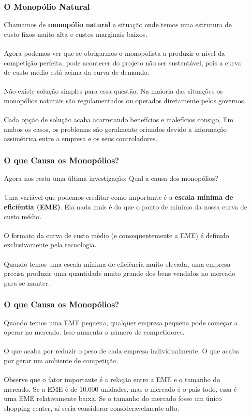 \documentclass{beamer}[10]
\begin{document}
\begin{frame}
	\frametitle{O Monopólio Natural}

	Chamamos de \textbf{monopólio natural} a situação onde temos uma estrutura de custo fixos muito alta e custos marginais baixos.
	\\~\\
	Agora podemos ver que se obrigarmos o monopolista a produzir o nível da competição perfeita, pode acontecer do projeto não ser sustentável, pois a curva de custo médio está acima da curva de demanda.
	\\~\\
	Não existe solução simples para essa questão. Na maioria das situações os monopólios naturais são regulamentados ou operados diretamente pelos governos.
	\\~\\
	Cada opção de solução acaba acarretando benefícios e malefícios consigo. Em ambos os casos, os problemas são geralmente oriundos devido a informação assimétrica entre a empresa e os seus controladores.
\end{frame}


\begin{frame}
	\frametitle{O que Causa os Monopólios?}

	Agora nos resta uma última investigação: Qual a causa dos monopólios?
	\\~\\
	Uma variável que podemos creditar como importante é a \textbf{escala mínima de eficiêntia (EME)}. Ela nada mais é do que o ponto de mínimo da nossa curva de custo médio.
	\\~\\
	O formato da curva de custo médio (e consequentemente a EME) é definido exclusivamente pela tecnologia.
	\\~\\
	Quando temos uma escala mínima de eficiência muito elevada, uma empresa precisa produzir uma quantidade muito grande dos bens vendidos no mercado para se manter.
\end{frame}

\begin{frame}
	\frametitle{O que Causa os Monopólios?}
	Quando temos uma EME pequena, qualquer empresa pequena pode começar a operar no mercado. Isso aumenta o número de competidores.
	\\~\\
	O que acaba por reduzir o peso de cada empresa individualmente. O que acaba por gerar um ambiente de competição.
	\\~\\
	Observe que o fator importante é a relação entre a EME e o tamanho do mercado. Se a EME é de 10.000 unidades, mas o mercado é o país todo, essa é uma EME relativamente baixa. Se o tamanho do mercado fosse um único shopping center, aí seria considerar consideravelmente alta.
\end{frame}
\end{document}
